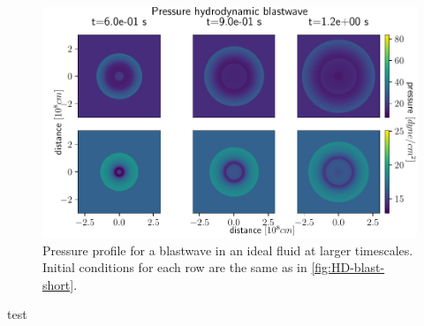\begin{figure}[h]
	\centering
	\includegraphics[width=\linewidth]{images/HD-blast-prs-2.pdf}
	\caption{Pressure profile for a blastwave in an ideal fluid at larger timescales. Initial conditions for each row are the same as in \autoref{fig:HD-blast-short}.}
	\label{fig:HD-blast-long}
\end{figure}

test
